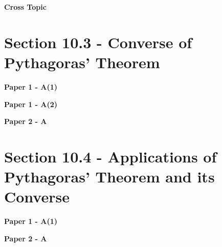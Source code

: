 \documentclass[12pt, a4paper]{article}
\begin{document}
\textbf{Cross Topic}
\begin{enumx}[label=\arabic*.,start=15]
\item {}\label{DSE2012P-CoreP2-Q16} 
\item {}\label{DSE2012-CoreP2-Q21} 
\item {}\label{DSE2019-CoreP1-Q03} 
\end{enumx}




\section*{Section 10.3 - Converse of Pythagoras' Theorem}\label{section:2-10-3}

\textbf{Paper 1 - A(1)}
\begin{enumx}[label=\arabic*.,start=18]
\item {}\label{DSE2014-CoreP1-Q09} 
\end{enumx}
\textbf{Paper 1 - A(2)}
\begin{enumx}[label=\arabic*.,start=19]
\item {}\label{DSE2016-CoreP1-Q13} 
\end{enumx}
\textbf{Paper 2 - A}
\begin{enumx}[label=\arabic*.,start=20]
\item {}\label{DSE2016-CoreP2-Q16} 
\item {}\label{DSE2020-CoreP2-Q21} 
\end{enumx}




\section*{Section 10.4 - Applications of Pythagoras' Theorem and its Converse}\label{section:2-10-4}

\textbf{Paper 1 - A(1)}
\begin{enumx}[label=\arabic*.,start=22]
\item {}\label{DSE2024-CoreP1-Q07} 
\end{enumx}
\textbf{Paper 2 - A}
\begin{enumx}[label=\arabic*.,start=23]
\item {}\label{DSE2024-CoreP2-Q18} 
\end{enumx}
\end{document}
